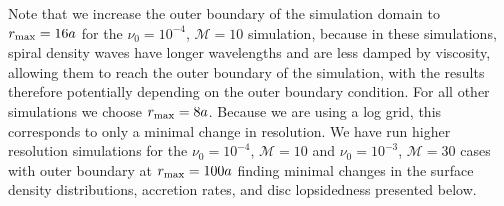 \documentclass[usenatbib]{mnras}
\def\Mach{\mathcal{M}}
\begin{document}
Note that we increase the outer boundary of the simulation domain to
$r_{\rm max}=16a$ for the $\nu_0 = 10^{-4}$, $\Mach=10$ simulation,
because in these simulations, spiral density waves have longer
wavelengths and are less damped by viscosity, allowing them to reach
the outer boundary of the simulation, with the results therefore
potentially depending on the outer boundary condition. For all other
simulations we choose $r_{\rm max}=8a$. Because we are using a log
grid, this corresponds to only a minimal change in resolution. We have
run higher resolution simulations for the $\nu_0 = 10^{-4}$,
$\Mach=10$ and $\nu_0 = 10^{-3}$, $\Mach=30$ cases with outer boundary
at $r_{\rm max}=100a$ finding minimal changes in the surface density
distributions, accretion rates, and disc lopsidedness presented below.
\end{document}
